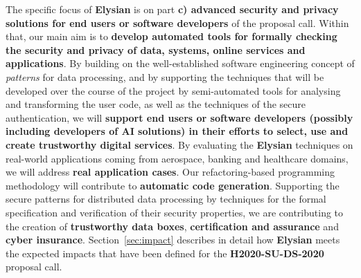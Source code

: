 \documentclass[a4paper,11pt]{article}
\newcommand{\project}[1]{\textbf{#1}\xspace}
\newcommand{\SECURITY}{\project{Elysian}}
\newcommand{\TheProject}{\SECURITY}
\begin{document}
The specific focus of \TheProject{} is on part \textbf{c) advanced security and privacy solutions for end users or software developers} of the proposal call. Within that, our main aim is to \textbf{develop automated tools for formally checking the security and privacy of data, systems, online services and applications}. By building on the well-established software engineering concept of \emph{patterns} for data processing, and by supporting the techniques that will be developed over the course of the project by semi-automated tools for analysing and transforming the user code, as well as the techniques of the secure authentication, we will \textbf{support end users or software developers (possibly including developers of AI solutions) in their efforts to select, use and create trustworthy digital services}. By evaluating the \TheProject{} techniques on real-world applications coming from aerospace, banking and healthcare domains, we will address \textbf{real application cases}. Our refactoring-based programming methodology will contribute to \textbf{automatic code generation}. Supporting the secure patterns for distributed data processing by techniques for the formal specification and verification of their security properties, we are contributing to the creation of \textbf{trustworthy data boxes}, \textbf{certification and assurance} and \textbf{cyber insurance}.
%
Section~\ref{sec:impact} describes in detail how \TheProject{} meets the expected impacts that have been defined for the \textbf{H2020-SU-DS-2020} proposal call.
\end{document}
